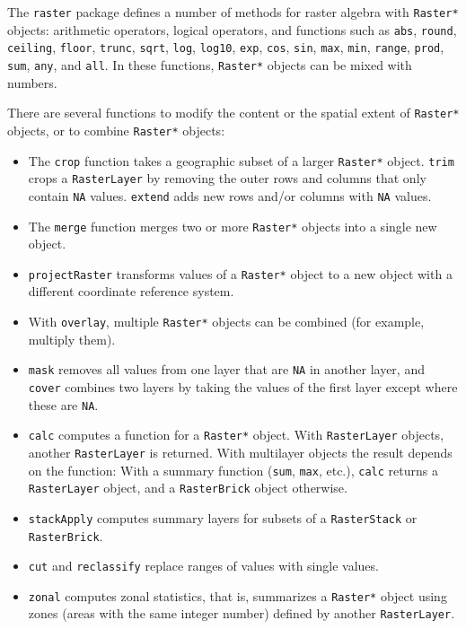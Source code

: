 The \texttt{raster} package defines a number of methods for raster
algebra with \texttt{Raster*} objects: arithmetic operators, logical
operators, and functions such as \texttt{abs}, \texttt{round},
\texttt{ceiling}, \texttt{floor}, \texttt{trunc}, \texttt{sqrt},
\texttt{log}, \texttt{log10}, \texttt{exp}, \texttt{cos},
\texttt{sin}, \texttt{max}, \texttt{min}, \texttt{range},
\texttt{prod}, \texttt{sum}, \texttt{any}, and \texttt{all}. In these
functions, \texttt{Raster*} objects can be mixed with numbers.

There are several functions to modify the content or the spatial
extent of \texttt{Raster*} objects, or to combine \texttt{Raster*}
objects:
\begin{itemize}
\item The \texttt{crop} function takes a geographic subset of a larger
  \texttt{Raster*} object. \texttt{trim} crops a \texttt{RasterLayer}
  by removing the outer rows and columns that only contain \texttt{NA}
  values. \texttt{extend} adds new rows and/or columns with
  \texttt{NA} values.
\item The \texttt{merge} function merges two or more \texttt{Raster*}
  objects into a single new object.
\item \texttt{projectRaster} transforms values of a \texttt{Raster*}
  object to a new object with a different coordinate reference system.
\item With \texttt{overlay}, multiple \texttt{Raster*} objects can be
  combined (for example, multiply them).
\item \texttt{mask} removes all values from one layer that are
  \texttt{NA} in another layer, and \texttt{cover} combines two layers
  by taking the values of the first layer except where these are
  \texttt{NA}.
\item \texttt{calc} computes a function for a \texttt{Raster*}
  object. With \texttt{RasterLayer} objects, another
  \texttt{RasterLayer} is returned. With multilayer objects the result
  depends on the function: With a summary function (\texttt{sum},
  \texttt{max}, etc.),  \texttt{calc} returns a \texttt{RasterLayer}
  object, and a \texttt{RasterBrick} object otherwise.
\item \texttt{stackApply} computes summary layers for subsets of a
  \texttt{RasterStack} or \texttt{RasterBrick}.
\item \texttt{cut} and \texttt{reclassify} replace ranges of values
  with single values.
\item \texttt{zonal} computes zonal statistics, that is, summarizes a
  \texttt{Raster*} object using zones (areas with the same integer
  number) defined by another \texttt{RasterLayer}.
\end{itemize}


